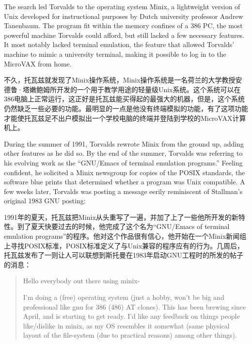 \ifdefined\eng
The search led Torvalds to the operating system Minix, a lightweight version of Unix developed for instructional purposes by Dutch university professor Andrew Tanenbaum. The program fit within the memory confines of a 386 PC, the most powerful machine Torvalds could afford, but still lacked a few necessary features. It most notably lacked terminal emulation, the feature that allowed Torvalds' machine to mimic a university terminal, making it possible to log in to the MicroVAX from home.
\fi

\ifdefined\chs
不久，托瓦兹就发现了Minix操作系统，Minix操作系统是一名荷兰的大学教授安德鲁·塔嫩鲍姆所开发的一个用于教学用途的轻量级Unix系统。这个系统可以在386电脑上正常运行，这正好是托瓦兹能买得起的最强大的机器，但是，这个系统仍然缺乏一些必要的功能。最明显的一点是他没有终端模拟的功能，有了这项功能才能使托瓦兹足不出户模拟出一个学校电脑的终端并登陆到学校的MicroVAX计算机上。
\fi

\ifdefined\eng
During the summer of 1991, Torvalds rewrote Minix from the ground up, adding other features as he did so. By the end of the summer, Torvalds was referring to his evolving work as the ``GNU/Emacs of terminal emulation programs.'' Feeling confident, he solicited a Minix newsgroup for copies of the POSIX standards, the software blue prints that determined whether a program was Unix compatible. A few weeks later, Torvalds was posting a message eerily reminiscent of Stallman's original 1983 GNU posting:
\fi

\ifdefined\chs
1991年的夏天，托瓦兹把Minix从头重写了一遍，并加了上了一些他所开发的新特性。到了夏天快要过去的时候，他完成了这个名为``GNU/Emacs of terminal emulation programs''的程序。他对这个作品很有信心，他开始在一个Minix新闻组上寻找POSIX标准，POSIX标准定义了与Unix兼容的程序应有的行为。几周后，托瓦兹发布了一则让人可以联想到斯托曼在1983年启动GNU工程时的所发的帖子的消息：
\fi

\ifdefined\eng
\begin{quote}
Hello everybody out there using minix-

I'm doing a (free) operating system (just a hobby, won't be big and professional like gnu for 386 (486) AT clones). This has been brewing since April, and is starting to get ready. I'd like any feedback on things people like/dislike in minix, as my OS resembles it somewhat (same physical layout of the file-system (due to practical reasons) among other things). 
\end{quote}
\fi

